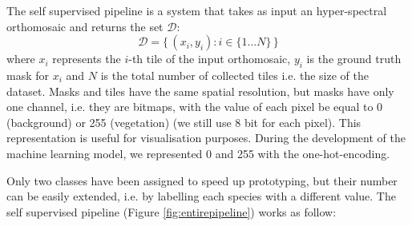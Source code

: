\documentclass[comsoc,final]{IEEEtran}
\newcommand{\todo}[1]{\textcolor{red}{#1}}
\begin{document}
The self supervised pipeline is a system that takes as input an hyper-spectral orthomosaic and returns the set $\mathcal{D}$: \[
\mathcal{D} = \{\, (x_i,y_i):i \in \{1...N\}\,\}
\] where $x_i$ represents the $i$-th tile of the input orthomosaic, $y_i$ is the ground truth mask for $x_i$ and $N$ is the total number of collected tiles i.e. the size of the dataset.
Masks and tiles have the same spatial resolution, but masks have only one channel, i.e. they are bitmaps, with the value of each pixel be equal to 0 (background) or 255 (vegetation) (we still use 8 bit for each pixel). This representation is useful for visualisation purposes. During the development of the machine learning model, we represented 0 and 255 with the one-hot-encoding.

Only two classes have been assigned to speed up prototyping, but their number can be easily extended, i.e. by labelling each species with a different value. The self supervised pipeline (Figure \ref{fig:entirepipeline}) works as follow:
\end{document}
